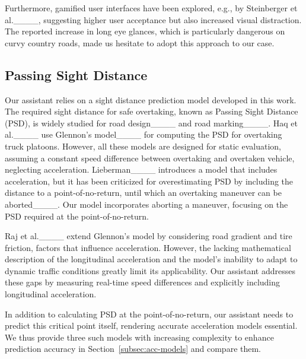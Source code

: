 Furthermore, gamified user interfaces have been explored, e.g., by Steinberger et al.____, suggesting higher user acceptance but also increased visual distraction. 
The reported increase in long eye glances, which is particularly dangerous on curvy country roads, made us hesitate to adopt this approach to our case.













\subsection{Passing Sight Distance }\label{subsec:psd}

Our assistant relies on a sight distance prediction model developed in this work. 
The required sight distance for safe overtaking, known as Passing Sight Distance (PSD), is widely studied for road design____ and road marking____. 
Haq et al.____ use Glennon’s model____ for computing the PSD for overtaking truck platoons.
However, all these models are designed for static evaluation, assuming a constant speed difference between overtaking and overtaken vehicle, neglecting acceleration.
Lieberman____ introduces a model that includes acceleration, but it has been criticized for overestimating PSD by including the distance to a point-of-no-return, until which an overtaking maneuver can be aborted____. 
Our model incorporates aborting a maneuver, focusing on the PSD required at the point-of-no-return.



Raj et al.____ extend Glennon’s model by considering road gradient and tire friction, factors that influence acceleration. 
However, the lacking mathematical description of the longitudinal acceleration and the model's inability to adapt to dynamic traffic conditions greatly limit its applicability. 
Our assistant addresses these gaps by measuring real-time speed differences and explicitly including longitudinal acceleration.


In addition to calculating PSD at the point-of-no-return, our assistant needs to predict this critical point itself, rendering accurate acceleration models essential. 
We thus provide three such models with increasing complexity to enhance prediction accuracy in Section~\ref{subsec:acc-models} and compare them.